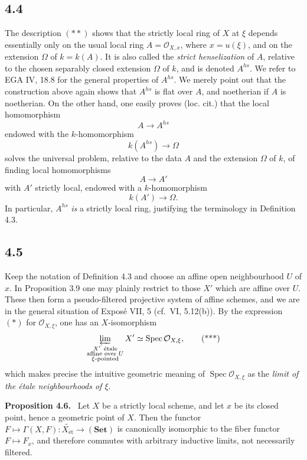 \documentclass[11pt]{article}
\newcommand{\Oo}{\mathcal{O}}
\newcommand{\Spec}{\operatorname{Spec}}
\newcommand{\et}{\mathrm{\acute{e}t}}
\newcommand{\cf}{cf.\ }
\newcommand{\EGA}{EGA}
\newenvironment{statement}[1]{\par\medskip\noindent\textbf{#1.}\ }{\par\medskip}
\begin{document}
\subsection*{4.4}
The description \((**)\) shows that the strictly local ring of \(X\) at \(\xi\) depends essentially only on the usual local ring \(A=\Oo_{X,x}\), where \(x=u(\xi)\), and on the extension \(\Omega\) of \(k=k(A)\). It is also called the \emph{strict henselization} of \(A\), relative to the chosen separably closed extension \(\Omega\) of \(k\), and is denoted \(A^{hs}\). We refer to \EGA{} IV, 18.8 for the general properties of \(A^{hs}\). We merely point out that the construction above again shows that \(A^{hs}\) is flat over \(A\), and noetherian if \(A\) is noetherian. On the other hand, one easily proves (loc. cit.) that the local homomorphism
\[
A\longrightarrow A^{hs}
\]
endowed with the \(k\)-homomorphism
\[
k(A^{hs})\longrightarrow \Omega
\]
solves the universal problem, relative to the data \(A\) and the extension \(\Omega\) of \(k\), of finding local homomorphisms
\[
A\longrightarrow A'
\]
with \(A'\) strictly local, endowed with a \(k\)-homomorphism
\[
k(A')\longrightarrow \Omega.
\]
In particular, \(A^{hs}\) \emph{is} a strictly local ring, justifying the terminology in Definition 4.3.

\subsection*{4.5}
Keep the notation of Definition 4.3 and choose an affine open neighbourhood \(U\) of \(x\). In Proposition 3.9 one may plainly restrict to those \(X'\) which are affine over \(U\). These then form a pseudo-filtered projective system of affine schemes, and we are in the general situation of Expos\'e VII, 5 (\cf VI, 5.12(b)). By the expression \((*)\) for \(\Oo_{X,\xi}\), one has an \(X\)-isomorphism
\[
\varprojlim_{\substack{X'\ \text{\'etale}\\ \text{affine over }U\\ \xi\text{-pointed}}}X'
\simeq \Spec \Oo_{X,\xi},
\tag{***}
\]
which makes precise the intuitive geometric meaning of \(\Spec\Oo_{X,\xi}\) as the \emph{limit of the \'etale neighbourhoods of \(\xi\)}.

\begin{statement}{Proposition 4.6}
Let \(X\) be a strictly local scheme, and let \(x\) be its closed point, hence a geometric point of \(X\). Then the functor \(F\mapsto\Gamma(X,F):\widetilde{X_{\et}}\to(\mathbf{Set})\) is canonically isomorphic to the fiber functor \(F\mapsto F_x\), and therefore commutes with arbitrary inductive limits, not necessarily filtered.
\end{statement}
\end{document}
